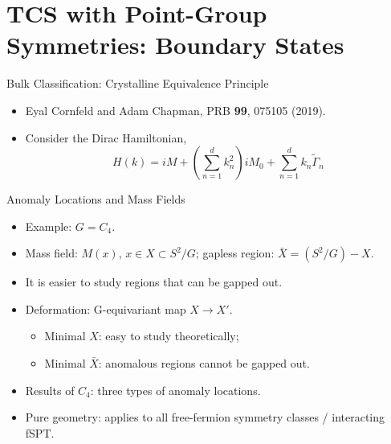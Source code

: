 \documentclass[xcolor=table, 11pt, aspectratio=169]{beamer}
\begin{document}
  \section{TCS with Point-Group Symmetries: Boundary States}

  \begin{frame}{Bulk Classification: Crystalline Equivalence Principle}
    \begin{itemize}
      \item Eyal Cornfeld and Adam Chapman, PRB \textbf{99}, 075105 (2019).
      \item Consider the Dirac Hamiltonian,
      \[H(k)=iM+\left(\sum_{n=1}^d k_n^2\right)iM_0+\sum_{n=1}^d k_n\tilde{\Gamma}_n\]
    \end{itemize}
  \end{frame}

  \begin{frame}{Anomaly Locations and Mass Fields}
    \begin{itemize}
      \item Example: $G=C_4$.
      \item Mass field: $M(x)$, $x\in X\subset S^2/G$; gapless region: $\bar X=(S^2/G) - X$.
      \item It is easier to study regions that can be gapped out.
      \item Deformation: G-equivariant map $X\rightarrow X'$.
      \begin{itemize}
        \item Minimal $X$: easy to study theoretically;
        \item Minimal $\bar X$: anomalous regions cannot be gapped out.
      \end{itemize}
      \item Results of $C_4$: three types of anomaly locations.
      \item Pure geometry: applies to all free-fermion symmetry classes / interacting fSPT.
    \end{itemize}
    \begin{center}
      \hspace{2em}
      \begin{animateinline}{30}
      \end{animateinline}
    \end{center}
  \end{frame}
\end{document}
